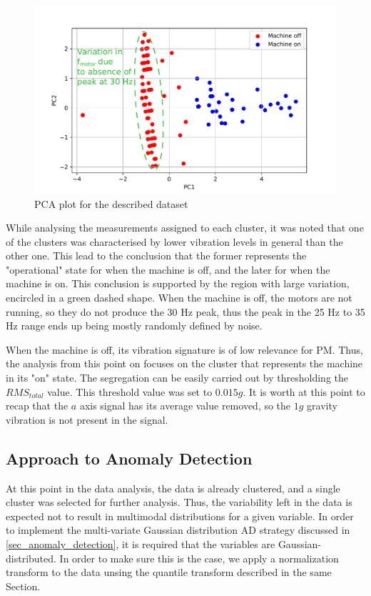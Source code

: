 \documentclass[conference]{IEEEtran}
\begin{document}
\begin{figure}[htbp]
\centerline{\includegraphics[width=\columnwidth]{graphics/pca_result/pca_result.pdf}}
\caption{PCA plot for the described dataset}
\label{fig_pca_result}
\end{figure}

While analysing the measurements assigned to each cluster, it was noted that one of the clusters was characterised by lower vibration levels in general than the other one. This lead to the conclusion that the former represents the "operational" state for when the machine is off, and the later for when the machine is on. This conclusion is supported by the region with large variation, encircled in a green dashed shape. When the machine is off, the motors are not running, so they do not produce the 30 Hz peak, thus the peak in the 25 Hz to 35 Hz range ends up being mostly randomly defined by noise.

When the machine is off, its vibration signature is of low relevance for PM. Thus, the analysis from this point on focuses on the cluster that represents the machine in its "on" state. The segregation can be easily carried out by thresholding the $RMS_{total}$ value. This threshold value was set to $0.015g$. It is worth at this point to recap that the $a$ axis signal has its average value removed, so the $1g$ gravity vibration is not present in the signal.



\subsection{Approach to Anomaly Detection}


At this point in the data analysis, the data is already clustered, and a single cluster was selected for further analysis. Thus, the variability left in the data is expected not to result in multimodal distributions for a given variable. In order to implement the multi-variate Gaussian distribution AD strategy discussed in \ref{sec_anomaly_detection}, it is required that the variables are Gaussian-distributed. In order to make sure this is the case, we apply a normalization transform to the data unsing the quantile transform described in the same Section.
\end{document}
